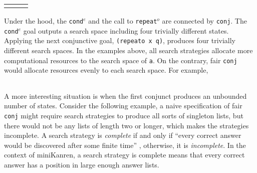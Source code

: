 \documentclass[format=acmlarge, review=true, authordraft=true]{acmart}
\newcommand{\conde}{\texttt{cond$^e$}}
\newcommand{\conj}{\texttt{conj}}
\newcommand{\repeato}{\texttt{repeat$^o$}}
\begin{document}
\begin{center}
\begin{tabular}{l|c|r}
     &
     &
     \\
\end{tabular}
\end{center}

Under the hood, the \conde{} and the call to \repeato{} are connected by 
\conj{}. The \conde{} goal outputs a search space including four trivially 
different states. 
Applying the next conjunctive goal, \texttt{(repeato x q)}, produces four 
trivially different search spaces.
In the examples above, all search strategies allocate more computational 
resources to the search space of \texttt{a}. On the contrary, fair \conj{} 
would allocate resources evenly to each search space. For example,

\begin{center}
	\begin{tabular}{c}
		
	\end{tabular}
\end{center}

A more interesting situation is when the first conjunct produces an unbounded
number of states. Consider the following example, a naive specification of 
fair \conj{} 
might require search strategies to produce all sorts of singleton lists, but 
there
would not be any lists of length two or longer, which makes the strategies 
incomplete. 
A search strategy is \emph{complete} if and only if ``every correct answer 
would be discovered after some finite time'' \cite{seres1999algebra}, 
otherwise, it is \emph{incomplete}. In the 
context of miniKanren, a search strategy is complete means that every correct 
answer has a position in large enough answer lists.


\begin{center}
	\begin{tabular}{c}
		
	\end{tabular}
\end{center}
\end{document}
